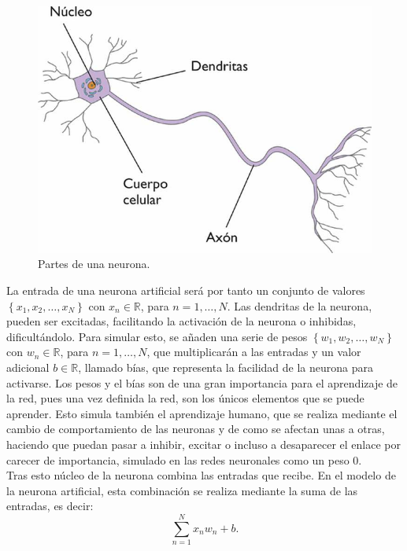 \begin{figure}
\begin{center}

\includegraphics[scale=0.35]{img/partes_neurona.jpg}
\end{center}

\caption{Partes de una neurona.}
\label{NN}
\end{figure}

La entrada de una neurona artificial será por tanto un conjunto de valores $\left\lbrace x_1,x_2,\ldots,x_N\right\rbrace$ con $x_n \in \mathbb{R}$, para $n = 1,\ldots,N$. Las dendritas de la neurona, pueden ser excitadas, facilitando la activación de la neurona o inhibidas, dificultándolo. Para simular esto, se añaden una serie de pesos $\left\lbrace w_1,w_2,\ldots,w_N\right\rbrace$ con $w_n \in \mathbb{R}$, para $n = 1,\ldots,N$, que multiplicarán a las entradas y un valor adicional $b \in \mathbb{R}$, llamado bías, que representa la facilidad de la neurona para activarse. Los pesos y el bías son de una gran importancia para el aprendizaje de la red, pues una vez definida la red, son los únicos elementos que se puede aprender. Esto simula también el aprendizaje humano, que se realiza mediante el cambio de comportamiento de las neuronas y de como se afectan unas a otras, haciendo que puedan pasar a inhibir, excitar o incluso a desaparecer el enlace por carecer de importancia, simulado en las redes neuronales como un peso 0.\\

Tras esto núcleo de la neurona combina las entradas que recibe. En el modelo de la neurona artificial, esta combinación se realiza mediante la suma de las entradas, es decir: $$\sum^N_{n=1} x_n w_n + b. $$

